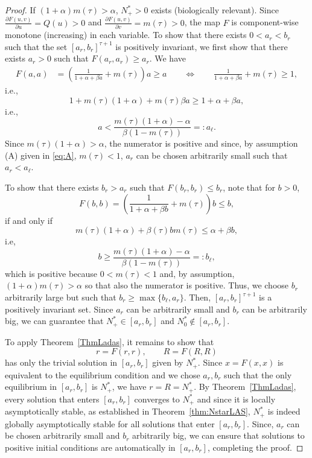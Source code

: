 \documentclass{article}
\numberwithin{theorem}{section}
\begin{document}
{\begin{proof}
If $(1+\alpha)m(\tau)>\alpha$, $N^*_+>0$ exists (biologically relevant). 
Since $\frac{\partial F(u,v)}{\partial u}=Q(u)>0$ and $\frac{\partial F(u,v)}{\partial v}=m(\tau)>0$, the map $F$ is component-wise monotone (increasing) in each variable. 
To show that there exists $0<a_r<b_r$ such that the set $[a_r,b_r]^{\tau+1}$ is positively invariant, we first show that there exists $a_r>0$ such that 
$F(a_r,a_r)\geq a_r$. We have
\begin{align*}
F(a,a)&=\left(\frac{1}{1+\alpha+\beta a} + m(\tau)\right)a\geq a \qquad \iff \qquad 
\frac{1}{1+\alpha+\beta a} + m(\tau)\geq 1,
\end{align*}
i.e., 
$$1+m(\tau)(1+\alpha)+m(\tau)\beta a\geq 1+\alpha+\beta a,$$
i.e., 
$$a<\frac{m(\tau)(1+\alpha)-\alpha}{\beta (1-m(\tau))}=:a_\ell.$$
Since $m(\tau)(1+\alpha)>\alpha$, the numerator is positive and since, by assumption (A) given in \eqref{eq:A}, $m(\tau)<1$, $a_r$ can be chosen arbitrarily small such that $a_r<a_\ell$. 

To show that there exists $b_r>a_r$ such that $F(b_r,b_r)\leq b_r$, note that for $b>0$,  
$$F(b,b)=\left(\frac{1}{1+\alpha+\beta b} + m(\tau)\right)b\leq b,$$
if and only if 
$$m(\tau)(1+\alpha)+\beta (\tau)  b m(\tau)\leq \alpha+\beta b,$$
i.e, 
$$b\geq \frac{m(\tau)(1+\alpha)-\alpha}{\beta (1-m(\tau))}=:b_\ell,$$
which is positive because $0<m(\tau)<1$ and, by assumption, $(1+\alpha)m(\tau)>\alpha$ so that also the numerator is positive. Thus, we choose $b_r$ arbitrarily large but such that $b_r\geq \max\{b_\ell, a_r\}$. 
Then, $[a_r, b_r]^{\tau+1}$ is a positively invariant set. Since $a_r$ can be arbitrarily small and $b_r$ can be arbitrarily big, we can guarantee that $N^*_+\in [a_r,b_r]$ and $N^*_0\notin [a_r, b_r]$. 

To apply Theorem~\ref{ThmLadas}, it remains to show that
$$r=F(r,r), \qquad R=F(R,R)$$
has only the trivial solution in $[a_r,b_r]$ given by  $N^*_+$. Since $x=F(x,x)$ is equivalent to the equilibrium condition and we chose $a_r, b_r$ such that the only equilibrium in $[a_r,b_r]$ is $N^*_+$, we have $r=R=N^*_+$. By Theorem~\ref{ThmLadas}, every solution that enters $[a_r,b_r]$ converges to $N^*_+$ and since it is locally asymptotically stable, as established in Theorem~\ref{thm:NstarLAS},  $N^*_+$ is indeed globally asymptotically stable for all solutions that enter $[a_r,b_r]$. Since, $a_r$ can be  chosen arbitrarily small and $b_r$ arbitrarily big, we can ensure that solutions to positive initial conditions are automatically in $[a_r, b_r]$, completing the proof. 


\end{proof}}
\end{document}
